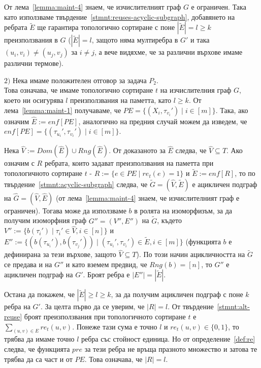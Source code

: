 \documentclass[12pt,twoside,a4paper]{article}
\begin{document}
\begin{theorem}
		От лема~\ref{lemma:maint-4} знаем, че изчислителният граф $G$ е ограничен. Така като използваме твърдение~\ref{stmnt:reuses-acyclic-subgraph}, добавянето на ребрата $\tilde{E}$ ще гарантира топологично сортиране с поне $|\tilde{E}|=l \ge k$ преизползвания в $G$ ($|\tilde{E}|=l$, защото няма мултиребра в $G'$ и така $(u_i,v_i) \neq (u_j,v_j)$ за $i \neq j$, а вече видяхме, че за различни върхове имаме различни термове).
		
		$2)$ Нека имаме положителен отговор за задача $P_2$.\\
		Това означава, че имаме топологично сортиране $t$ на изчислителния граф $G$, което ни осигурява $l$ преизползвания на паметта, като $l \ge k$. От лема~\ref{lemma:maint-1} получаваме, че $PE = \{(X_i, \tau_{v_i}') \mid i \in [m]\}$. Така, ако означим $\hat{E}:=enf[PE]$, аналогично на предния случай можем да изведем, че $enf[PE]=\{(\tau_{u_i}',\tau_{v_i}') \mid i \in [m]\}$.
		
		Нека $\hat{V} := Dom(\hat{E}) \cup Rng(\hat{E})$. От доказаното за $\hat{E}$ следва, че $\hat{V} \subseteq T$. Ако означим с $R$ ребрата, които задават преизползвания на паметта при топологичното сортиране $t$ - $R := \{e \in PE \mid re_t(e)=1\}$ и $\tilde{E} := enf[R]$, то по твърдение~\ref{stmnt:acyclic-subgraph} следва, че $\tilde{G}=(\hat{V},\tilde{E})$ е ацикличен подграф на $\hat{G}=(\hat{V},\hat{E})$ (от лема~\ref{lemma:maint-4} знаем, че изчислителният граф е ограничен). Тогава може да използваме $b$ в ролята на изоморфизъм, за да получим изоморфния граф $G''=(V'',E'')$ на $\tilde{G}$, където $V'':=\{b(\tau_i') \mid \tau_i' \in \hat{V}, i \in [n]\}$ и $E'':=\{(b(\tau_{u_i}'), b(\tau_{v_j}')) \mid (\tau_{u_i}', \tau_{v_i}') \in \tilde{E}, i \in [m]\}$ (функцията $b$ е дефинирана за тези върхове, защото $\hat{V} \subseteq T$). По този начин ацикличността на $\tilde{G}$ се предава и на $G''$ и като вземем предвид, че $Rng(b) = [n]$, то $G''$ е ацикличен подграф на $G'$. Броят ребра е $|E''|=|\tilde{E}|$.
		
		Остана да покажем, че $|\tilde{E}| \ge l \ge k$, за да получим ацикличен подграф с поне $k$ ребра на $G'$. За целта първо да се уверим, че $|R|=l$. От твърдение~\ref{stmnt:alt-reuse} броят преизползвания при топологичното сортиране $t$ е $\sum_{(u,v) \in E}{re_t(u,v)}$. Понеже тази сума е точно $l$ и $re_t(u,v) \in \{0, 1\}$, то трябва да имаме точно $l$ ребра със стойност единица. Но от определение~\ref{def:re} следва, че функцията $pre$ за тези ребра не връща празното множество и затова те трябва да са част и от $PE$. Това означава, че $|R|=l$.
		

\end{theorem}
\end{document}
